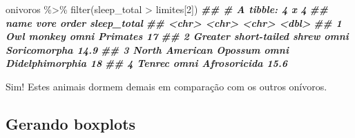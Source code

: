 \documentclass[
  11pt]{report}
\newenvironment{Shaded}{\begin{snugshade}}{\end{snugshade}}
\newcommand{\DecValTok}[1]{\textcolor[rgb]{0.00,0.00,0.81}{#1}}
\newcommand{\DocumentationTok}[1]{\textcolor[rgb]{0.56,0.35,0.01}{\textbf{\textit{#1}}}}
\newcommand{\FunctionTok}[1]{\textcolor[rgb]{0.00,0.00,0.00}{#1}}
\newcommand{\NormalTok}[1]{#1}
\newcommand{\SpecialCharTok}[1]{\textcolor[rgb]{0.00,0.00,0.00}{#1}}
\renewenvironment{Shaded}{
  \begin{mdframed}[%
    roundcorner=2pt,%
    innerleftmargin=5pt,%
    innerrightmargin=5pt,%
    topline=true,%
    leftline=true,%
    rightline=true,%
    bottomline=true,%
    linewidth=0.5pt,%
    linecolor=black!20,%
    backgroundcolor=black!2,%
    skipabove=2ex,%
    skipbelow=2.5ex%
  ]%
}
{
  \end{mdframed}
}
\begin{document}
\begin{itemize}
\begin{Shaded}
\begin{Highlighting}[]
\NormalTok{onivoros }\SpecialCharTok{\%\textgreater{}\%} 
  \FunctionTok{filter}\NormalTok{(sleep\_total }\SpecialCharTok{\textgreater{}}\NormalTok{ limites[}\DecValTok{2}\NormalTok{])}
\DocumentationTok{\#\# \# A tibble: 4 x 4}
\DocumentationTok{\#\#   name                       vore  order           sleep\_total}
\DocumentationTok{\#\#   \textless{}chr\textgreater{}                      \textless{}chr\textgreater{} \textless{}chr\textgreater{}                 \textless{}dbl\textgreater{}}
\DocumentationTok{\#\# 1 Owl monkey                 omni  Primates               17  }
\DocumentationTok{\#\# 2 Greater short{-}tailed shrew omni  Soricomorpha           14.9}
\DocumentationTok{\#\# 3 North American Opossum     omni  Didelphimorphia        18  }
\DocumentationTok{\#\# 4 Tenrec                     omni  Afrosoricida           15.6}
\end{Highlighting}
\end{Shaded}

  Sim! Estes animais dormem demais em comparação com os outros onívoros.
\end{itemize}

\hypertarget{gerando-boxplots}{%
\subsection{Gerando boxplots}\label{gerando-boxplots}}
\end{document}
